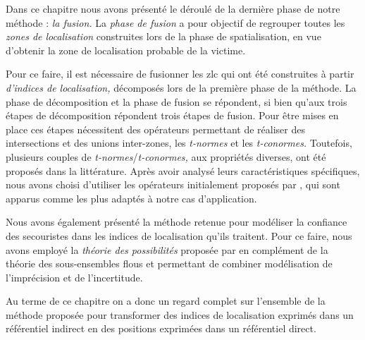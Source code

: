 Dans ce chapitre nous avons présenté le déroulé de la dernière phase
de notre méthode : \emph{la fusion.} La \emph{phase de fusion} a pour
objectif de regrouper toutes les \emph{zones de localisation}
construites lors de la phase de spatialisation, en vue d'obtenir la
zone de localisation probable de la victime.

Pour ce faire, il est nécessaire de fusionner les \ac{zlc} qui ont été
construites à partir \emph{d'indices de localisation,} décomposés lors
de la première phase de la méthode. La phase de décomposition et la
phase de fusion se répondent, si bien qu'aux trois étapes de
décomposition répondent trois étapes de fusion. Pour être mises en
place ces étapes nécessitent des opérateurs permettant de réaliser des
intersections et des unions inter-zones, les \emph{t-normes} et les
\emph{t-conormes.} Toutefois, plusieurs couples de
\emph{t-normes}/\emph{t-conormes,} aux propriétés diverses, ont été
proposés dans la littérature. Après avoir analysé leurs
caractéristiques spécifiques, nous avons choisi d'utiliser les
opérateurs initialement proposés par \textcite{Zadeh1965}, qui sont
apparus comme les plus adaptés à notre cas d’application.

Nous avons également présenté la méthode retenue pour modéliser la
confiance des secouristes dans les indices de localisation qu'ils
traitent. Pour ce faire, nous avons employé la \emph{théorie des
  possibilités} proposée par \textcite{Zadeh1978} en complément de la
théorie des sous-ensembles flous et permettant de combiner
modélisation de l’imprécision et de l'incertitude.

Au terme de ce chapitre on a donc un regard complet sur l'ensemble de
la méthode proposée pour transformer des indices de localisation
exprimés dans un référentiel indirect en des positions exprimées dans
un référentiel direct.

